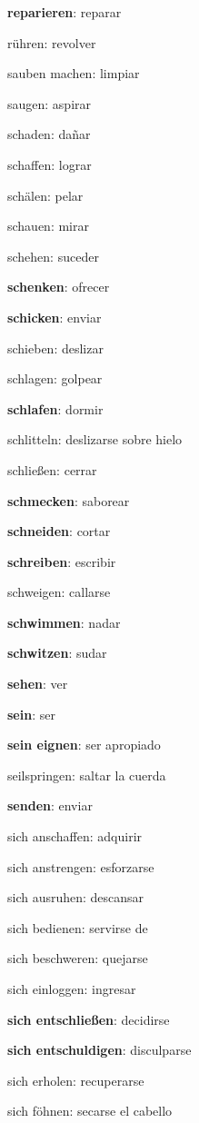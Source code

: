 \begin{multicols}{2}
\begin{myitemize}
\item \textbf{reparieren}: reparar
\item rühren: revolver
\item sauben machen: limpiar
\item saugen: aspirar
\item schaden: dañar
\item schaffen: lograr
\item schälen: pelar 
\item schauen: mirar
\item schehen: suceder
\item \textbf{schenken}: ofrecer
\item \textbf{schicken}: enviar
\item schieben: deslizar
\item schlagen: golpear
\item \textbf{schlafen}: dormir
\item schlitteln: deslizarse sobre hielo
\item schließen: cerrar
\item \textbf{schmecken}: saborear
\item \textbf{schneiden}: cortar
\item \textbf{schreiben}: escribir
\item schweigen: callarse
\item \textbf{schwimmen}: nadar
\item \textbf{schwitzen}: sudar
\item \textbf{sehen}: ver
\item \textbf{sein}: ser
\item \textbf{sein eignen}: ser apropiado
\item seilspringen: saltar la cuerda
\item \textbf{senden}: enviar
\item sich anschaffen: adquirir
\item sich anstrengen: esforzarse
\item sich ausruhen: descansar
\item sich bedienen: servirse de
\item sich beschweren: quejarse
\item sich einloggen: ingresar
\item \textbf{sich entschließen}: decidirse
\item \textbf{sich entschuldigen}: disculparse
\item sich erholen: recuperarse
\item sich föhnen: secarse el cabello

\end{myitemize}
\end{multicols}
